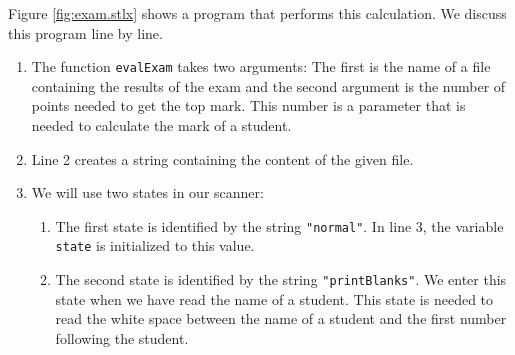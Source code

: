 \noindent
Figure \ref{fig:exam.stlx} shows a program that performs this calculation.  We discuss this
program line by line.
\begin{enumerate}
\item The function \texttt{evalExam} takes two arguments:  The first is the name of a file
      containing the results of the exam and the second argument is the number of points 
      needed to get the top mark.  This number is a parameter that is needed to calculate
      the mark of a student.
\item Line 2 creates a string containing the content of the given file.
\item We will use two states in our scanner:
      \begin{enumerate}
      \item The first state is identified by the string \texttt{"normal"}.
            In line 3, the variable \texttt{state} is initialized to this value.
      \item The second state is identified by the string \texttt{"printBlanks"}. 
            We enter this state when we have read the name of a student.
            This state is needed to read the white space between the name of a student 
            and the first number following the student.


\end{enumerate}
\end{enumerate}
